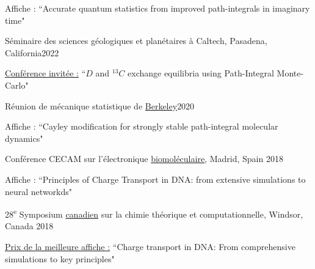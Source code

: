 \documentclass[margin,line]{res}
\newenvironment{list1}{
 \begin{list}{\ding{113}}{%
  \setlength{\itemsep}{0in}
  \setlength{\parsep}{0in} \setlength{\parskip}{0in}
  \setlength{\topsep}{0in} \setlength{\partopsep}{0in} 
  \setlength{\leftmargin}{0.17in}}}{\end{list}}
\begin{document}
\begin{resume}
\begin{list1}
\item[]Affiche : ``Accurate quantum statistics from improved path-integrals in imaginary time"
\end{list1}

\vspace*{-1mm}

Séminaire des sciences géologiques et planétaires à Caltech, Pasadena, California\hfill{2022}

\begin{list1}
\item[]\underline{Conférence invitée :} ``$D$ and $^{13}C$ exchange equilibria using Path-Integral Monte-Carlo"
\end{list1}

\vspace*{-1mm}

Réunion de mécanique statistique de  \href{http://berkeleystatmech.org/}{Berkeley}\hfill{2020}

\begin{list1}
\item[]Affiche : ``Cayley modification for strongly stable path-integral molecular dynamics"
\end{list1}

\vspace*{-1mm}

Conférence CECAM sur l'électronique \href{https://www.cecam.org/workshop-details/cecampsi-k-research-conference-biomolecular-electronics-biomolectro-246}{biomoléculaire}, Madrid, Spain \hfill {2018}

\begin{list1}
\item[]Affiche : ``Principles of Charge Transport in DNA: from extensive simulations to neural networkds"
\end{list1}

\vspace*{-1mm}

28\textsuperscript{e} Symposium \href{http://catc.ca/cstcc2018}{canadien} sur la chimie théorique et computationnelle, Windsor, Canada \hfill {2018}

\begin{list1}
\item[]\underline{Prix de la meilleure affiche :} ``Charge transport in DNA: From comprehensive simulations to key principles"
\end{list1}

\vspace*{-1mm}


\end{resume}
\end{document}
